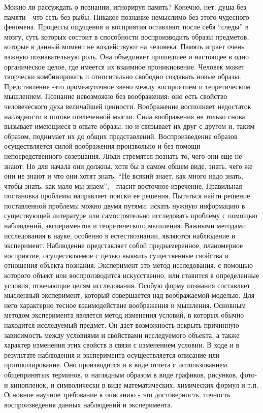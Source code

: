 \documentclass[12pt]{article}
\begin{document}
Можно ли рассуждать о познании, игнорируя память? Конечно, нет: душа без памяти - что сеть без рыбы.
Никакое познание немыслимо без этого чудесного феномена. Процессы ощущения и восприятия оставляют
после себя “следы” в мозгу, суть которых состоит в способности воспроизводить образы предметов, которые в
данный  момент  не  воздействуют  на  человека.  Память  играет  очень  важную  познавательную  роль.  Она
объединяет прошедшее и настоящее в одно органическое целое, где имеется их взаимное проникновение.
Человек может творчески комбинировать и относительно свободно создавать новые образы. Представление -это  промежуточное  звено  между  восприятием  и  теоретическим  мышлением.  Познание  невозможно  без
воображения:  оно  есть  свойство  человеческого  духа  величайшей  ценности.  Воображение  восполняет
недостаток наглядности в потоке отвлеченной мысли. Сила воображения не только снова вызывает имеющиеся
в опыте образы, но и связывает их друг с другом и, таким образом, поднимает их до общих представлений.
Воспроизведение образов осуществляется силой воображения произвольно и без помощи непосредственного
созерцания.
Люди стремятся познать то, чего они еще не знают. Но для начала они должны, хотя бы в самом общем виде,
знать, чего же они не знают и что они хотят знать. “Не всякий знает, как много надо знать, чтобы знать, как мало
мы знаем”, - гласит восточное изречение.
Правильная  постановка  проблемы  направляет  поиски  ее  решения.  Пытаться  найти  решение  поставленной
проблемы можно двумя путями: искать нужную информацию в существующей литературе или самостоятельно
исследовать проблему с помощью наблюдений, экспериментов и теоретического мышления.
Важными методами исследования в науке, особенно в естествознании, являются наблюдение и эксперимент.
Наблюдение представляет собой преднамеренное, планомерное восприятие, осуществляемое с целью выявить
существенные свойства  и отношения  объекта  познания.  Эксперимент  это  метод  исследования, с  помощью
которого объект или воспроизводится искусственно, или ставится в определенные условия, отвечающие целям
исследования.  Особую  форму  познания  составляет  мысленный  эксперимент,  который  совершается  над
воображаемой моделью. Для него характерно тесное взаимодействие воображения и мышления. Основным
методом эксперимента является метод изменения условий, в которых обычно находится исследуемый предмет.
Он дает возможность вскрыть причинную зависимость между условиями и свойствами исследуемого объекта, а
также характер изменения этих свойств в связи с изменением условии.
В  ходе  и  в  результате  наблюдения  и  эксперимента  осуществляется  описание  или  протоколирование.  Оно
производится  и  в  виде  отчета  с  использованием  общепринятых  терминов,  и  наглядным  образом  в  виде
графиков, рисунков, фото- и кинопленок, и символически в виде математических, химических формул и т.п.
Основное научное требование к описанию - это достоверность, точность воспроизведения данных наблюдений
и эксперимента. 
\end{document}
